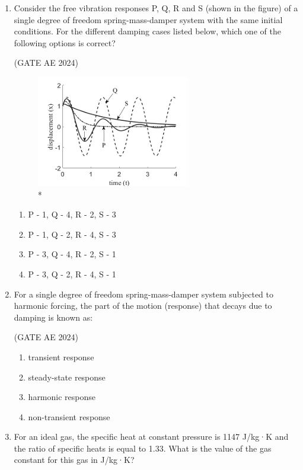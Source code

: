 \documentclass[journal,12pt,onecolumn]{IEEEtran}
\theoremstyle{remark}
\begin{document}
\begin{flushleft}
\begin{enumerate}
\item Consider the free vibration responses P, Q, R and S (shown in the figure) of a single degree of freedom spring-mass-damper system with the same initial conditions. For the different damping cases listed below, which one of the following options is correct? 

\hfill (GATE AE 2024)

\begin{figure}[H]
\includegraphics[width=0.5\columnwidth]{figs/xt.png}
\caption{*}
    \label{fig:placeholder}
\end{figure}


\begin{enumerate}
    \item P - 1, Q - 4, R - 2, S - 3
    \item P - 1, Q - 2, R - 4, S - 3
    \item P - 3, Q - 4, R - 2, S - 1
    \item P - 3, Q - 2, R - 4, S - 1
\end{enumerate}

\item For a single degree of freedom spring-mass-damper system subjected to harmonic forcing, the part of the motion (response) that decays due to damping is known as:

\hfill (GATE AE 2024)

 \begin{enumerate}
    \item transient response
    \item steady-state response
    \item harmonic response
    \item non-transient response
 \end{enumerate}   


\item For an ideal gas, the specific heat at constant pressure is 1147 J/kg·K and the ratio of specific heats is equal to 1.33. What is the value of the gas constant for this gas in J/kg·K? 


\end{enumerate}
\end{flushleft}
\end{document}
